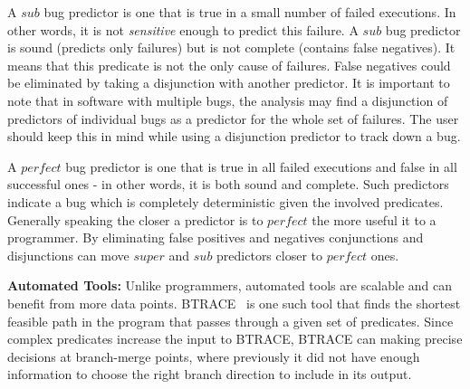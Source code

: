 A $sub$ bug predictor is one that is true in a small number of failed executions.  In other words, it is not {\em sensitive} enough to predict this failure.  A $sub$ bug predictor is sound (predicts only failures) but is not complete (contains false negatives).  It means that this predicate is not the only cause of failures.  False negatives could be eliminated by taking a disjunction with another predictor.  It is important to note that in software with multiple bugs, the analysis may find a disjunction of predictors of individual bugs as a predictor for the whole set of failures.  The user should keep this in mind while using a disjunction predictor to track down a bug.

A $perfect$ bug predictor is one that is true in all failed executions and false in all successful ones - in other words, it is both sound and complete.  Such predictors indicate a bug which is completely deterministic given the involved predicates.  Generally speaking the closer a predictor is to $perfect$ the more useful it to a programmer.  By eliminating false positives and negatives conjunctions and disjunctions can move $super$ and $sub$ predictors closer to $perfect$ ones.

\vspace{4pt} \noindent
{\bf Automated Tools:}  Unlike programmers, automated tools are scalable and can benefit from more data points.  BTRACE~\cite{Lal:2006:POPAD} is one such tool that finds the shortest feasible path in the program that passes through a given set of predicates.  Since complex predicates increase the input to BTRACE, BTRACE can making precise decisions at branch-merge points, where previously it did not have enough information to choose the right branch direction to include in its output.
